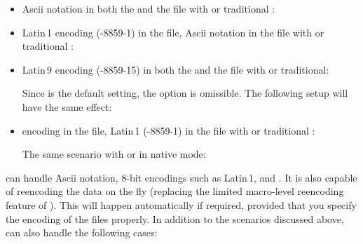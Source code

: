 \documentclass{ltxdockit}[2011/03/25]
\newcommand*{\biber}{\sty{biber}\xspace}
\newcommand*{\biblatex}{\sty{biblatex}\xspace}
\begin{document}
\begin{itemize}
\setlength{\itemsep}{0pt}

\item Ascii notation in both the  and the  file with \pdftex or traditional \tex:

\begin{ltxexample}
\usepackage{biblatex}
\end{ltxexample}

\item Latin\,1 encoding (-8859-1) in the  file, Ascii notation in the  file with \pdftex or traditional \tex :

\begin{ltxexample}
\usepackage[latin1]{inputenc}
\usepackage[bibencoding=ascii]{biblatex}
\end{ltxexample}

\item Latin\,9 encoding (-8859-15) in both the  and the  file with \pdftex or traditional:

\begin{ltxexample}
\usepackage[latin9]{inputenc}
\usepackage[bibencoding=auto]{biblatex}
\end{ltxexample}
%
Since  is the default setting, the option is omissible. The following setup will have the same effect:

\begin{ltxexample}
\usepackage[latin9]{inputenc}
\usepackage{biblatex}
\end{ltxexample}

\item \utf encoding in the  file, Latin\,1 (-8859-1) in the  file with \pdftex or traditional \tex:

\begin{ltxexample}
\usepackage[utf8]{inputenc}
\usepackage[bibencoding=latin1]{biblatex}
\end{ltxexample}

The same scenario with \xetex or \luatex in native \utf mode:

\begin{ltxexample}
\usepackage[bibencoding=latin1]{biblatex}
\end{ltxexample}

\end{itemize}

\biber can handle Ascii notation, 8-bit encodings such as Latin\,1, and \utf. It is also capable of reencoding the  data on the fly (replacing the limited macro-level reencoding feature of \biblatex). This will happen automatically if required, provided that you specify the encoding of the  files properly. In addition to the scenarios discussed above, \biber can also handle the following cases:
\end{document}
